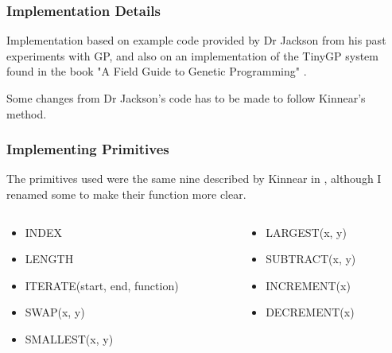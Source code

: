 \documentclass{beamer}
\begin{document}
		\begin{frame}
		
			\frametitle{Implementation Details}
			
			Implementation based on example code provided by Dr Jackson from his past experiments with GP, and also on an implementation of the TinyGP system found in the book "A Field Guide to Genetic Programming" \cite{poli_field_2008}.
			
			Some changes from Dr Jackson's code has to be made to follow Kinnear's method.
		
		\end{frame}
	
		\begin{frame}
			
			\frametitle{Implementing Primitives}
			
			The primitives used were the same nine described by Kinnear in \cite{kinnear_evolving_1993}, although I renamed some to make their function more clear.
			
			\begin{columns}[T]
				
				\begin{column}{0.5\textwidth}
					
					\begin{itemize}
						\item INDEX
						\item LENGTH
						\item ITERATE(start, end, function)
						\item SWAP(x, y)
						\item SMALLEST(x, y)
					\end{itemize}
					
				\end{column}
			
				\begin{column}{0.5\textwidth}
					
					\begin{itemize}
					\item LARGEST(x, y)
					\item SUBTRACT(x, y)
					\item INCREMENT(x)
					\item DECREMENT(x)
					\end{itemize}
					
				\end{column}
				
			\end{columns}
	
		\end{frame}
	
\end{document}
